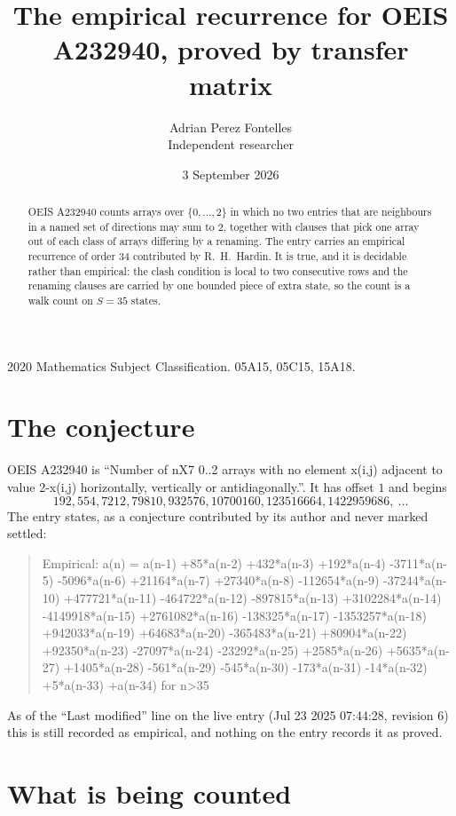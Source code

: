 \documentclass[11pt,a4paper]{article}
\title{The empirical recurrence for OEIS A232940, proved by transfer matrix}
\author{Adrian Perez Fontelles\\ \small Independent researcher}
\date{3 September 2026}
\theoremstyle{plain}
\theoremstyle{definition}
\begin{document}
\maketitle

\begin{abstract}
OEIS A232940 counts arrays over $\{0,\dots,2\}$ in which no two entries that are neighbours in
a named set of directions may sum to $2$, together with clauses that pick one array out of
each class of arrays differing by a renaming. The entry carries an empirical recurrence of
order $34$ contributed by R.~H.~Hardin. It is true, and it is decidable rather than
empirical: the clash condition is local to two consecutive rows and the renaming clauses are
carried by one bounded piece of extra state, so the count is a walk count on $S=35$ states.
\end{abstract}

\noindent\small 2020 Mathematics Subject Classification. 05A15, 05C15, 15A18.\normalsize

\section{The conjecture}

OEIS A232940 is ``Number of nX7 0..2 arrays with no element x(i,j) adjacent to value 2-x(i,j) horizontally, vertically or antidiagonally.''. It has offset $1$ and begins
\[
192, 554, 7212, 79810, 932576, 10700160, 123516664, 1422959686,\ \dots
\]
The entry states, as a conjecture contributed by its author and never marked settled:
\begin{quote}
Empirical: a(n) = a(n-1) +85*a(n-2) +432*a(n-3) +192*a(n-4) -3711*a(n-5) -5096*a(n-6) +21164*a(n-7) +27340*a(n-8) -112654*a(n-9) -37244*a(n-10) +477721*a(n-11) -464722*a(n-12) -897815*a(n-13) +3102284*a(n-14) -4149918*a(n-15) +2761082*a(n-16) -138325*a(n-17) -1353257*a(n-18) +942033*a(n-19) +64683*a(n-20) -365483*a(n-21) +80904*a(n-22) +92350*a(n-23) -27097*a(n-24) -23292*a(n-25) +2585*a(n-26) +5635*a(n-27) +1405*a(n-28) -561*a(n-29) -545*a(n-30) -173*a(n-31) -14*a(n-32) +5*a(n-33) +a(n-34) for n>35
\end{quote}
As of the ``Last modified'' line on the live entry (Jul 23 2025 07:44:28, revision 6) this is still
recorded as empirical, and nothing on the entry records it as proved.

\section{What is being counted}
\end{document}
